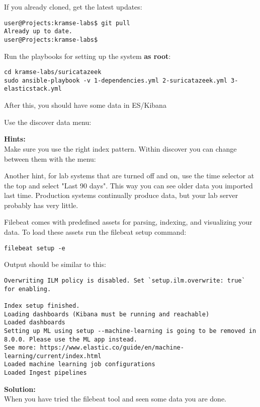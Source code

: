 \documentclass[a4paper,11pt,notitlepage]{report}
\begin{document}
If you already cloned, get the latest updates:
\begin{verbatim}
user@Projects:kramse-labs$ git pull
Already up to date.
user@Projects:kramse-labs$
\end{verbatim}

Run the playbooks for setting up the system {\bf as root}:
\begin{verbatim}
cd kramse-labs/suricatazeek
sudo ansible-playbook -v 1-dependencies.yml 2-suricatazeek.yml 3-elasticstack.yml
\end{verbatim}

After this, you should have some data in ES/Kibana

Use the discover data menu:


{\bf Hints:}\\
Make sure you use the right index pattern. Within discover you can change between them with the menu:


Another hint, for lab systems that are turned off and on, use the time selector at the top and select "Last 90 days". This way you can see older data you imported last time. Production systems continually produce data, but your lab server probably has very little.


Filebeat comes with predefined assets for parsing, indexing, and visualizing your data. To load these assets run the filebeat setup command:

\begin{verbatim}
filebeat setup -e
\end{verbatim}

Output should be similar to this:
\begin{verbatim}
Overwriting ILM policy is disabled. Set `setup.ilm.overwrite: true` for enabling.

Index setup finished.
Loading dashboards (Kibana must be running and reachable)
Loaded dashboards
Setting up ML using setup --machine-learning is going to be removed in 8.0.0. Please use the ML app instead.
See more: https://www.elastic.co/guide/en/machine-learning/current/index.html
Loaded machine learning job configurations
Loaded Ingest pipelines
\end{verbatim}


{\bf Solution:}\\
When you have tried the filebeat tool and seen some data you are done.
\end{document}
